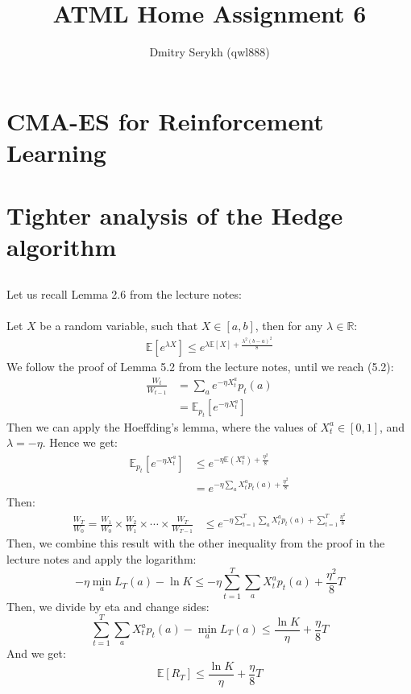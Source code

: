 \documentclass[a4paper]{article}
\title{\vspace{-5cm}ATML Home Assignment 6}
\author{Dmitry Serykh (qwl888)}
\newcommand{\expect}[1]{\mathbb{E}\left(#1\right)}
\begin{document}
\maketitle
\section{CMA-ES for Reinforcement Learning}
\label{sec:1}

\section{Tighter analysis of the Hedge algorithm}
\label{sec:2}
\subsection{}
\label{subsec:21}
Let us recall Lemma 2.6 from the lecture notes:\\\\
Let $X$ be a random variable, such that $X \in [a,b]$, then for any $\lambda \in \mathbb{R}$:
\begin{align}
  \label{hoeff}
  \mathbb{E}\left[e^{\lambda X}\right] \leq e^{\lambda \mathbb{E}[X]+\frac{\lambda^{2}(b-a)^{2}}{8}}
\end{align}
We follow the proof of Lemma 5.2 from the lecture notes, until we reach (5.2):
\begin{align*}
  \frac{W_t}{W_{t-1}} &= \sum_a e^{-\eta X_t^a}p_t(a)\\
  &= \mathbb{E}_{p_t}[e^{-\eta X_t^a}]
\end{align*}
Then we can apply the Hoeffding's lemma, where the values of $X_t^{a} \in [0,1]$,
and $\lambda = -\eta$. Hence we get:
\begin{align*}
  \mathbb{E}_{p_t}[e^{-\eta X_t^a}] &\leq e^{-\eta \expect{X_t^a} + \frac{\eta^2}{8}}\\
  &=e^{-\eta \sum_a X_t^a p_t(a) + \frac{\eta^2}{8}}
\end{align*}
Then:
\begin{align*}
  \frac{W_{T}}{W_{0}}=\frac{W_{1}}{W_{0}} \times \frac{W_{2}}{W_{1}} \times
  \cdots \times \frac{W_{T}}{W_{T-1}} &\leq
  e^{-\eta \sum_{t=1}^{T} \sum_{a} X_{t}^{a} p_{t}(a)+ \sum_{t=1}^{T}\frac{\eta^{2}}{8}}
\end{align*}
Then, we combine this result with the other inequality from the proof in the lecture
notes and apply the logarithm:
\[
-\eta \min _{a} L_{T}(a)-\ln K \leq
-\eta \sum_{t=1}^{T} \sum_{a} X_{t}^{a} p_{t}(a)+
\frac{\eta^{2}}{8} T
\]
Then, we divide by eta and change sides:
\[
\sum_{t=1}^{T} \sum_{a} X_{t}^{a} p_{t}(a)-\min _{a} L_{T}(a)
\leq
\frac{\ln K}{\eta}+\frac{\eta}{8}T
\]
And we get:
\[
\mathbb{E}\left[R_{T}\right] \leq \frac{\ln K}{\eta}+\frac{\eta}{8} T
\]
\end{document}
